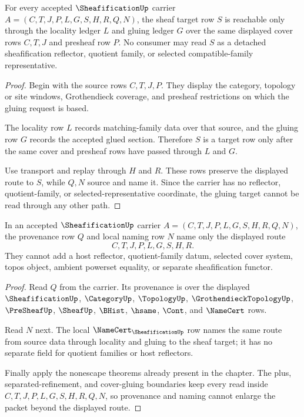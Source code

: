 \begin{theorem}
\label{thm:sheafification-gluing-target-obligation}
For every accepted $\SheafificationUp$ carrier $A=(C,T,J,P,L,G,S,H,R,Q,N)$, the sheaf target row $S$ is reachable only through the locality ledger $L$ and gluing ledger $G$ over the same displayed cover rows $C,T,J$ and presheaf row $P$. No consumer may read $S$ as a detached sheafification reflector, quotient family, or selected compatible-family representative.
\end{theorem}
\begin{proof}
Begin with the source rows $C,T,J,P$. They display the category, topology or site windows, Grothendieck coverage, and presheaf restrictions on which the gluing request is based.

The locality row $L$ records matching-family data over that source, and the gluing row $G$ records the accepted glued section. Therefore $S$ is a target row only after the same cover and presheaf rows have passed through $L$ and $G$.

Use transport and replay through $H$ and $R$. These rows preserve the displayed route to $S$, while $Q,N$ source and name it. Since the carrier has no reflector, quotient-family, or selected-representative coordinate, the gluing target cannot be read through any other path.
\end{proof}

\begin{theorem}
\label{thm:sheafification-provenance-naming-obligation}
In an accepted $\SheafificationUp$ carrier $A=(C,T,J,P,L,G,S,H,R,Q,N)$, the provenance row $Q$ and local naming row $N$ name only the displayed route
$$
C,T,J,P,L,G,S,H,R .
$$
They cannot add a host reflector, quotient-family datum, selected cover system, topos object, ambient powerset equality, or separate sheafification functor.
\end{theorem}
\begin{proof}
Read $Q$ from the carrier. Its provenance is over the displayed $\SheafificationUp$, $\CategoryUp$, $\TopologyUp$, $\GrothendieckTopologyUp$, $\PreSheafUp$, $\SheafUp$, $\BHist$, $\hsame$, $\Cont$, and $\NameCert$ rows.

Read $N$ next. The local $\NameCert_{\SheafificationUp}$ row names the same route from source data through locality and gluing to the sheaf target; it has no separate field for quotient families or host reflectors.

Finally apply the nonescape theorems already present in the chapter. The plus, separated-refinement, and cover-gluing boundaries keep every read inside $C,T,J,P,L,G,S,H,R,Q,N$, so provenance and naming cannot enlarge the packet beyond the displayed route.
\end{proof}

